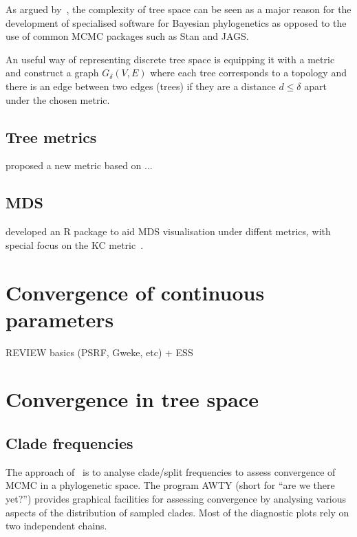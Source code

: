 As argued by~\cite{Drummond2015}, the complexity of tree space can be seen as a major reason for the development of specialised software for Bayesian phylogenetics as opposed to the use of common MCMC packages such as Stan and JAGS. 

An useful way of representing discrete tree space is equipping it with a metric and construct a graph $G_\delta(V, E)$ where each tree corresponds to a topology and there is an edge between two edges (trees) if they are a distance $d \leq \delta$ apart under the chosen metric.

\subsection{Tree metrics}
\label{sec:metrics}

\cite{Kendall2016} proposed a new metric based on ...

\subsection{MDS}
\label{sec:MDS}

\cite{Hillis2005}

\cite{Jombart2017} developed an R package to aid MDS visualisation under diffent metrics, with special focus on the KC metric~\citep{Kendall2016}.

\section{Convergence of continuous parameters}
REVIEW basics (PSRF, Gweke, etc) + ESS

\section{Convergence in tree space}
\label{sec:treespace}


\subsection{Clade frequencies}
\label{sec:awty}

The approach of~\cite{Nylander2004} is to analyse clade/split frequencies to assess convergence of MCMC in a phylogenetic space.
The program AWTY (short for ``are we there yet?'') provides graphical facilities for assessing convergence by analysing various aspects of the distribution of sampled clades.
Most of the diagnostic plots rely on two independent chains.

